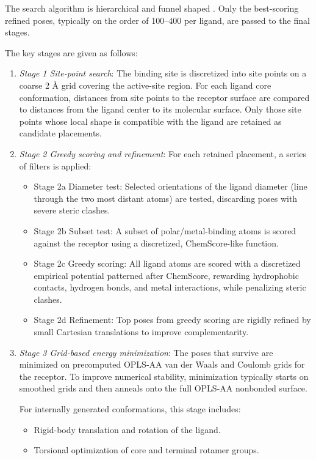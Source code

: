 \documentclass[12pt, a4paper]{article}
\begin{document}
The search algorithm is hierarchical and funnel shaped \cite{CH7_Friesner2004a}. Only the best-scoring refined poses, typically on the order of 100–400 per ligand, are passed to the final stages.

The key stages are given as follows:
\begin{enumerate}
  \item \textit{Stage 1 Site-point search}: The binding site is discretized into site points on a coarse 2 \r{A} grid covering the active-site region. For each ligand core conformation, distances from site points to the receptor surface are compared to distances from the ligand center to its molecular surface. Only those site points whose local shape is compatible with the ligand are retained as candidate placements.

  \item \textit{Stage 2 Greedy scoring and refinement}: For each retained placement, a series of filters is applied:
    \begin{itemize}
      \item Stage 2a Diameter test: Selected orientations of the ligand diameter (line through the two most distant atoms) are tested, discarding poses with severe steric clashes.
      \item Stage 2b Subset test: A subset of polar/metal-binding atoms is scored against the receptor using a discretized, ChemScore-like function.
      \item Stage 2c Greedy scoring: All ligand atoms are scored with a discretized empirical potential patterned after ChemScore, rewarding hydrophobic contacts, hydrogen bonds, and metal interactions, while penalizing steric clashes.
      \item Stage 2d Refinement: Top poses from greedy scoring are rigidly refined by small Cartesian translations to improve complementarity.
    \end{itemize}

  \item \textit{ Stage 3 Grid-based energy minimization}: The poses that survive are minimized on precomputed OPLS-AA van der Waals and Coulomb grids for the receptor. To improve numerical stability, minimization typically starts on smoothed grids and then anneals onto the full OPLS-AA nonbonded surface.

  For internally generated conformations, this stage includes:
    \begin{itemize}
      \item Rigid-body translation and rotation of the ligand.
      \item Torsional optimization of core and terminal rotamer groups.
    \end{itemize}


\end{enumerate}
\end{document}
